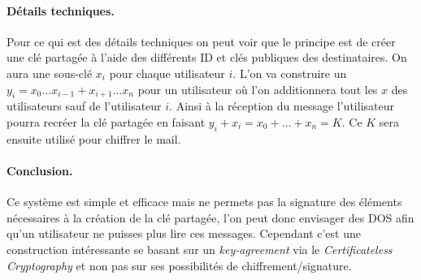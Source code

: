 \paragraph*{Détails techniques.} Pour ce qui est des détails techniques on peut voir que le principe est de créer une clé partagée à l'aide des différents ID et clés publiques des destinataires. On aura une sous-clé $x_i$ pour chaque utilisateur $i$. L'on va construire un $y_i = x_0 \dots x_{i-1} + x_{i+1} \dots x_n$ pour un utilisateur où l'on additionnera tout les $x$ des utilisateurs sauf de l'utilisateur $i$. Ainsi à la réception du message l'utilisateur pourra recréer la clé partagée en faisant $y_i + x_i = x_0 + \dots + x_n = K$. Ce $K$ sera ensuite utilisé pour chiffrer le mail.

\paragraph*{Conclusion.} Ce système est simple et efficace mais ne permets pas la signature des éléments nécessaires à la création de la clé partagée, l'on peut donc envisager des DOS afin qu'un utilisateur ne puisses plus lire ces messages. Cependant c'est une construction intéressante se basant sur un \textit{key-agreement} via le \textit{Certificateless Cryptography} et non pas sur ses possibilités de chiffrement/signature.



